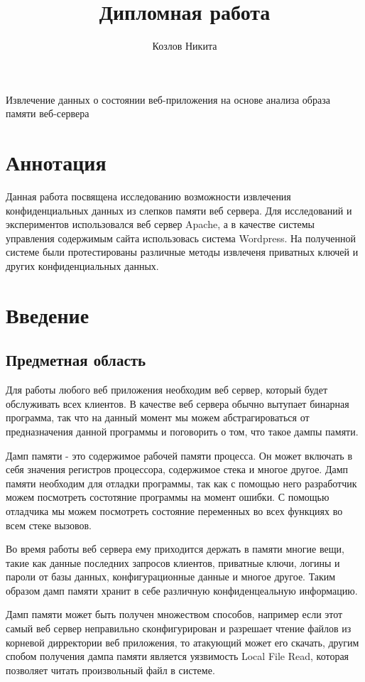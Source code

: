 \documentclass[20pt]{article}
\title{Дипломная работа}
\author{Козлов Никита}
\begin{document}
{\huge Извлечение данных о состоянии веб-приложения на основе анализа образа памяти веб-сервера}

\newpage

\section*{Аннотация}

Данная работа посвящена исследованию возможности извлечения конфиденциальных данных из слепков памяти веб сервера. Для исследований и экспериментов использовался веб сервер Apache, а в качестве системы управления содержимым сайта использовась система Wordpress. На полученной системе были протестированы
различные методы извлеченя приватных ключей и других конфиденциальных данных.

\newpage

\tableofcontents
\newpage

\section{Введение}

\subsection{Предметная область}

Для работы любого веб приложения необходим веб сервер, который будет обслуживать всех клиентов. В качестве веб сервера обычно вытупает бинарная
программа, так что на данный момент мы можем абстрагироваться от предназначения данной программы и поговорить о том, что такое дампы памяти.

Дамп памяти - это содержимое рабочей памяти процесса. Он может включать в себя значения регистров процессора, содержимое стека и многое другое.
Дамп памяти необходим для отладки программы, так как с помощью него разработчик можем посмотреть состотяние программы на момент ошибки.
С помощью отладчика мы можем посмотреть состояние переменных во всех функциях во всем стеке вызовов.

Во время работы веб сервера ему приходится держать в памяти многие вещи, такие как данные последних запросов клиентов, приватные ключи, логины
и пароли от базы данных, конфигурационные данные и многое другое. Таким образом дамп памяти хранит в себе различную конфиденцеальную информацию.

Дамп памяти может быть получен множеством способов, например если этот самый веб сервер неправильно сконфигурирован и разрешает
чтение файлов из корневой дирректории веб приложения, то атакующий может его скачать, другим спобом получения дампа памяти
является уязвимость Local File Read, которая позволяет читать произвольный файл в системе.
\end{document}
